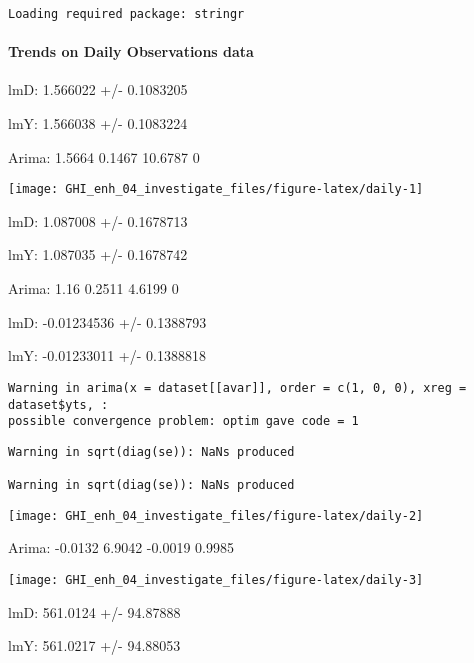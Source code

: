 \documentclass[
  10pt,
  a4paper,oneside]{article}
\begin{document}
\newpage

\begin{verbatim}
Loading required package: stringr
\end{verbatim}

\hypertarget{trends-on-daily-observations-data}{%
\paragraph{Trends on Daily Observations data}\label{trends-on-daily-observations-data}}

lmD: 1.566022 +/- 0.1083205

lmY: 1.566038 +/- 0.1083224

Arima: 1.5664 0.1467 10.6787 0

\begin{center}\texttt{[image: GHI\_enh\_04\_investigate\_files/figure-latex/daily-1]} \end{center}

lmD: 1.087008 +/- 0.1678713

lmY: 1.087035 +/- 0.1678742

Arima: 1.16 0.2511 4.6199 0

lmD: -0.01234536 +/- 0.1388793

lmY: -0.01233011 +/- 0.1388818

\begin{verbatim}
Warning in arima(x = dataset[[avar]], order = c(1, 0, 0), xreg = dataset$yts, :
possible convergence problem: optim gave code = 1
\end{verbatim}

\begin{verbatim}
Warning in sqrt(diag(se)): NaNs produced

Warning in sqrt(diag(se)): NaNs produced
\end{verbatim}

\begin{center}\texttt{[image: GHI\_enh\_04\_investigate\_files/figure-latex/daily-2]} \end{center}

Arima: -0.0132 6.9042 -0.0019 0.9985

\begin{center}\texttt{[image: GHI\_enh\_04\_investigate\_files/figure-latex/daily-3]} \end{center}

lmD: 561.0124 +/- 94.87888

lmY: 561.0217 +/- 94.88053
\end{document}
